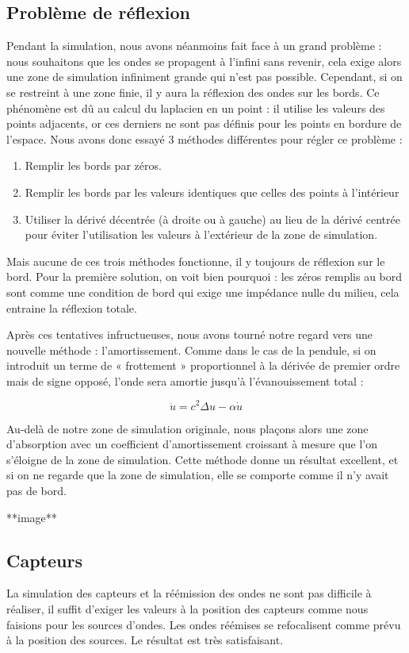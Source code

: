 \documentclass[11pt, a4paper]{article}
\begin{document}
\subsection{Problème de réflexion}
Pendant la simulation, nous avons néanmoins fait face à un grand problème : nous souhaitons que les ondes se propagent à l'infini sans revenir, cela exige alors une zone de simulation infiniment grande qui n'est pas possible. Cependant, si on se restreint à une zone finie, il y aura la réflexion des ondes sur les bords. Ce phénomène est dû au calcul du laplacien en un point : il utilise les valeurs des points adjacents, or ces derniers ne sont pas définis pour les points en bordure de l'espace. Nous avons donc essayé 3 méthodes différentes pour régler ce problème :

\begin{enumerate}
    \item Remplir les bords par zéros.
    \item Remplir les bords par les valeurs identiques que celles des points à l'intérieur
    \item Utiliser la dérivé décentrée (à droite ou à gauche) au lieu de la dérivé centrée pour éviter l'utilisation les valeurs à l'extérieur de la zone de simulation.
\end{enumerate}
Mais aucune de ces trois méthodes fonctionne, il y toujours de réflexion sur le bord. Pour la première solution, on voit bien pourquoi : les zéros remplis au bord sont comme une condition de bord qui exige une impédance nulle du milieu, cela entraine la réflexion totale.

Après ces tentatives infructueuses, nous avons tourné notre regard vers une nouvelle méthode : l'amortissement. Comme dans le cas de la pendule, si on introduit un terme de « frottement » proportionnel à la dérivée de premier ordre mais de signe opposé, l'onde sera amortie jusqu'à l'évanouissement total :

$$
    \ddot{u}=c^2\Delta u - \alpha\dot{u}
$$

Au-delà de notre zone de simulation originale, nous plaçons alors une zone d'absorption avec un coefficient d'amortissement croissant à mesure que l'on s'éloigne de la zone de simulation. Cette méthode donne un résultat excellent, et si on ne regarde que la zone de simulation, elle se comporte comme il n'y avait pas de bord.

**image**

\subsection{Capteurs}
La simulation des capteurs et la réémission des ondes ne sont pas difficile à réaliser, il suffit d'exiger les valeurs à la position des capteurs comme nous faisions pour les sources d'ondes. Les ondes réémises se refocalisent comme prévu à la position des sources. Le résultat est très satisfaisant.
\end{document}
